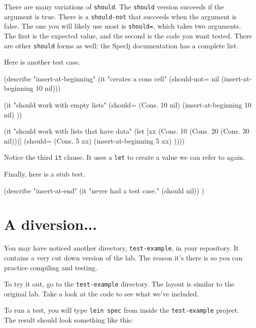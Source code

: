 \documentclass[12pt]{article}
\begin{document}
There are many variations of \texttt{should}.  The \texttt{should} version succeeds if the argument
is true.  There is a \texttt{should-not} that succeeds when the argument is false.  The one you will
likely use most is \texttt{should=}, which takes two arguments.  The first is the expected value,
and the second is the code you want tested.  There are other \texttt{should} forms as well; the
Speclj documentation has a complete list.

Here is another test case.

\begin{clojurecode}
(describe "insert-at-beginning"
          (it "creates a cons cell"
              (should-not= nil (insert-at-beginning 10 nil)))

          (it "should work with empty lists"
              (should= (Cons. 10 nil) (insert-at-beginning 10 nil) ))
          
          (it "should work with lists that have data"
              (let [xx (Cons. 10 (Cons. 20 (Cons. 30 nil)))]
                (should= (Cons. 5 xx) (insert-at-beginning 5 xx) ))))
\end{clojurecode}

Notice the third \texttt{it} clause.  It uses a \texttt{let} to create a value we can refer to
again.

Finally, here is a stub test.

\begin{clojurecode}
(describe "insert-at-end"
          (it "never had a test case."
              (should nil))
)
\end{clojurecode}

\section{A diversion...}

You may have noticed another directory, \texttt{test-example}, in your repository.  It contains a
very cut down version of the lab.  The reason it's there is so you can practice compiling and
testing. 

To try it out, go to the \texttt{test-example} directory.  The layout is similar to the original lab.
Take a look at the code to see what we've included.

To run a test, you will type \texttt{lein spec} from inside the \texttt{test-example} project.  The
result should look something like this:
\end{document}

